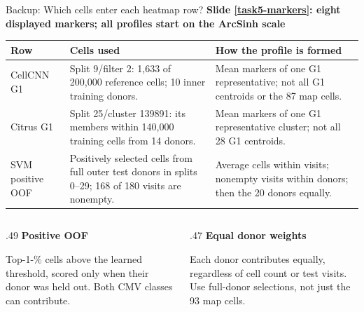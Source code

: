 \documentclass[aspectratio=169,10pt]{beamer}
\newcommand{\eyebrow}[1]{{\color{Teal}\bfseries #1}\par\smallskip}
\begin{document}
\begin{frame}{Backup: Which cells enter each heatmap row?}
  \small
  \eyebrow{Slide \ref{task5-markers}: eight displayed markers; all profiles start on the ArcSinh scale}
  {\renewcommand{\arraystretch}{1.15}\setlength{\tabcolsep}{3pt}
  \begin{tabular}{@{}>{\raggedright\arraybackslash}p{22mm}>{\raggedright\arraybackslash}p{57mm}>{\raggedright\arraybackslash}p{57mm}@{}}\toprule
    \textbf{Row} & \textbf{Cells used} & \textbf{How the profile is formed}\\\midrule
    CellCNN G1 & Split 9/filter 2: 1,633 of 200,000 reference cells; 10 inner training donors.
    & Mean markers of one G1 representative; not all G1 centroids or the 87 map cells.\\\addlinespace[3pt]
    Citrus G1 & Split 25/cluster 139891: its members within 140,000 training cells from 14 donors.
    & Mean markers of one G1 representative cluster; not all 28 G1 centroids.\\\addlinespace[3pt]
    SVM positive OOF & Positively selected cells from full outer test donors in splits 0--29; 168 of 180 visits are nonempty.
    & Average cells within visits; nonempty visits within donors; then the 20 donors equally.\\\bottomrule
  \end{tabular}}\par\medskip\vspace{1mm}
  \begin{columns}[T,onlytextwidth]
    \begin{column}{.49\textwidth}
      \textbf{Positive OOF}\par
      Top-1-\% cells above the learned threshold, scored only when their donor was held out. Both CMV classes can contribute.
    \end{column}
    \begin{column}{.47\textwidth}
      \textbf{Equal donor weights}\par
      Each donor contributes equally, regardless of cell count or test visits. Use full-donor selections, not just the 93 map cells.
    \end{column}
  \end{columns}
\end{frame}
\end{document}
